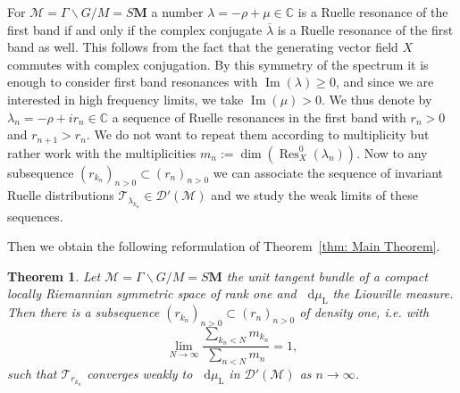 \documentclass[10pt]{amsart}
\newtheorem{theo}[cdrthm]{Theorem}
\theoremstyle{definition}
\DeclareMathOperator{\Res}{Res}
\DeclareMathOperator{\Imag}{Im}
\newcommand{\rml}{\mathrm{L}}
\newcommand{\mc}{\mathcal}
\newcommand{\cc}{\mathbb{C}}
\newcommand{\bfm}{\mathbf{M}}
\newcommand{\la}{\lambda}
\newcommand{\bbar}{\overline}
\let\Im=\Imag
\renewcommand{\Im}{\operatorname{Im}}
\newcommand{\intd}{\mathop{}\!\mathrm{d}}
\begin{document}
For $\mc{M} = \Gamma\backslash G/M=S{\bfm}$ a number $\la=-\rho+\mu \in\cc$ is a Ruelle resonance of the first band if and only if the complex conjugate $\bbar{\la}$ is a Ruelle resonance of the first band as well. This follows from the fact that the generating vector field $X$ commutes with complex conjugation. By this symmetry of the spectrum it is enough to consider first band resonances with $\Im(\la)\geq 0$, and since we are interested in high frequency limits, we take $\Im(\mu)>0$. We thus denote by $\la_n=-\rho+ir_n\in\cc$ a sequence of Ruelle resonances in the first band with $r_n >0$ and $r_{n+1}> r_n$. We do not want to repeat them according to multiplicity but rather work with the multiplicities $m_n := \dim(\Res^0_{X}(\la_n))$. Now to any subsequence $(r_{k_n})_{n>0} \subset (r_{n})_{n>0}$ we can associate the sequence of invariant Ruelle distributions $\mathcal T_{\la_{k_n}} \in \mc{D}'(\mc{M})$ and we study the weak limits of these sequences.

Then we obtain the following reformulation of Theorem~\ref{thm: Main Theorem}.

\begin{theo}\label{thm:hyperclassical}
Let $\mc{M} = \Gamma\backslash G/M=S{\bfm}$ the unit tangent bundle of a compact locally Riemannian symmetric space of rank one and $\intd\mu_{\rml}$ the Liouville measure. Then there is a subsequence $(r_{k_n})_{n>0} \subset (r_{n})_{n>0}$ of density one, i.e. with
\[
\lim_{N\to\infty}\frac{\sum_{k_n<N} m_{k_n}}{\sum_{n<N} m_{n}}=1,
\]
such that $\mathcal T_{r_{k_n}}$ converges weakly to $\intd \mu_{\rml}$ in $\mc{D}'(\mathcal M)$ as $n\to\infty$.
\end{theo}
\end{document}
